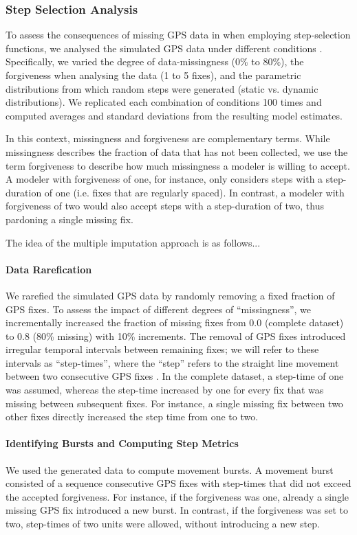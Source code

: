 \documentclass[abstract=on,10pt,a4paper,bibliography=totocnumbered]{article}
\begin{document}
\subsubsection{Step Selection Analysis}
To assess the consequences of missing GPS data in when employing step-selection
functions, we analysed the simulated GPS data under different conditions
. Specifically, we varied the degree of data-missingness (0\% to
80\%), the forgiveness when analysing the data (1 to 5 fixes), and the
parametric distributions from which random steps were generated (static vs.
dynamic distributions). We replicated each combination of conditions 100 times
and computed averages and standard deviations from the resulting model
estimates.

In this context, missingness and forgiveness are complementary terms. While
missingness describes the fraction of data that has not been collected, we use
the term forgiveness to describe how much missingness a modeler is willing to
accept. A modeler with forgiveness of one, for instance, only considers steps
with a step-duration of one (i.e. fixes that are regularly spaced). In contrast,
a modeler with forgiveness of two would also accept steps with a step-duration
of two, thus pardoning a single missing fix.

The idea of the multiple imputation approach is as follows...

\paragraph{Data Rarefication}
We rarefied the simulated GPS data by randomly removing a fixed fraction of GPS
fixes. To assess the impact of different degrees of  ``missingness'', we
incrementally increased the fraction of missing fixes from 0.0 (complete
dataset) to 0.8 (80\% missing) with 10\% increments. The removal of GPS fixes
introduced irregular temporal intervals between remaining fixes; we will refer
to these intervals as ``step-times'', where the  ``step'' refers to the straight
line movement between two consecutive GPS fixes \citep{Turchin.1998}. In the
complete dataset, a step-time of one was assumed, whereas the step-time
increased by one for every fix that was missing between subsequent fixes. For
instance, a single missing fix between two other fixes directly increased the
step time from one to two.

\paragraph{Identifying Bursts and Computing Step Metrics}
We used the generated data to compute movement bursts. A movement burst
consisted of a sequence consecutive GPS fixes with step-times that did not
exceed the accepted forgiveness. For instance, if the forgiveness was one,
already a single missing GPS fix introduced a new burst. In contrast, if the
forgiveness was set to two, step-times of two units were allowed, without
introducing a new step.
\end{document}
